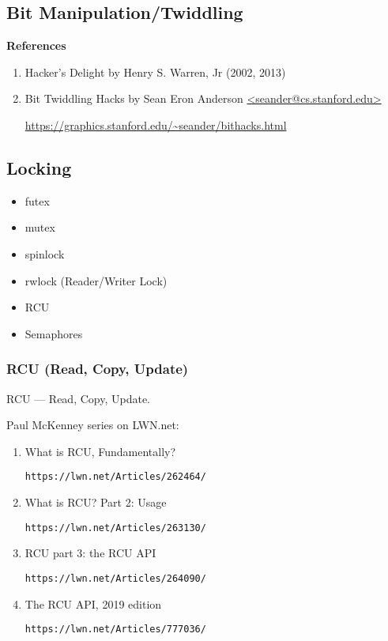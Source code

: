 \documentclass[12pt,a4paper]{article}
\begin{document}
\subsection{Bit Manipulation/Twiddling}

\textbf{References}

\begin{enumerate}
\item Hacker's Delight by Henry S. Warren, Jr (2002, 2013)

\item Bit Twiddling Hacks by Sean Eron Anderson \url{<seander@cs.stanford.edu>}

    \small
    \url{https://graphics.stanford.edu/~seander/bithacks.html}

\end{enumerate}

\subsection{Locking}

\begin{itemize}
\item futex
\item mutex
\item spinlock
\item rwlock (Reader/Writer Lock)
\item RCU
\item Semaphores
\end{itemize}

\subsubsection{RCU (Read, Copy, Update)}

RCU --- Read, Copy, Update.

Paul McKenney series on LWN.net:

\begin{enumerate}

\item What is RCU, Fundamentally?

	\texttt{https://lwn.net/Articles/262464/}

\item What is RCU? Part 2: Usage

	\texttt{https://lwn.net/Articles/263130/}

\item RCU part 3: the RCU API

	\texttt{https://lwn.net/Articles/264090/}

\item The RCU API, 2019 edition

	\texttt{https://lwn.net/Articles/777036/}

\end{enumerate}
\end{document}
